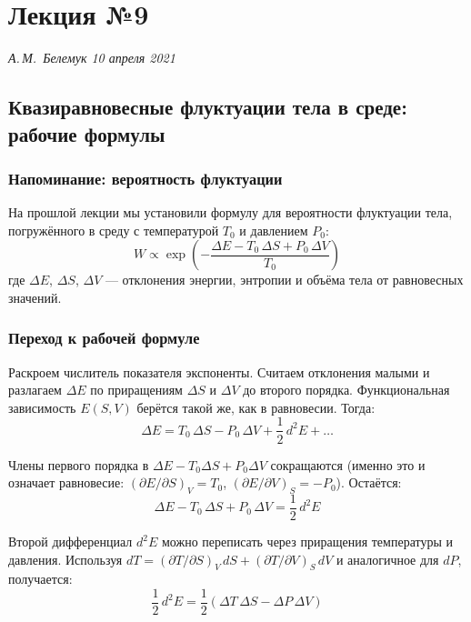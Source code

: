 \documentclass[../general/general]{subfiles}
\begin{document}
\chapter{Лекция №9}
\noindent\textit{А.\,М.~Белемук \hfill 10 апреля 2021}
\vspace{1em}
\ifSubfilesClassLoaded{\tableofcontents\newpage}{}


\section{Квазиравновесные флуктуации тела в среде: рабочие формулы}

\subsection{Напоминание: вероятность флуктуации}

На прошлой лекции мы установили формулу для вероятности флуктуации тела, погружённого в среду с температурой $T_0$ и давлением $P_0$:
\begin{equation}
    W \propto \exp\!\left(-\frac{\Delta E - T_0\,\Delta S + P_0\,\Delta V}{T_0}\right)
    \label{eq:W_medium_9}
\end{equation}
где $\Delta E$, $\Delta S$, $\Delta V$ --- отклонения энергии, энтропии и объёма тела от равновесных значений.

\subsection{Переход к рабочей формуле}

Раскроем числитель показателя экспоненты. Считаем отклонения малыми и разлагаем $\Delta E$ по приращениям $\Delta S$ и $\Delta V$ до второго порядка. Функциональная зависимость $E(S,V)$ берётся такой же, как в равновесии. Тогда:
\begin{equation}
    \Delta E = T_0\,\Delta S - P_0\,\Delta V + \frac{1}{2}\,d^2E + \ldots
\end{equation}

Члены первого порядка в $\Delta E - T_0\Delta S + P_0\Delta V$ сокращаются (именно это и означает равновесие: $(\partial E/\partial S)_V = T_0$, $(\partial E/\partial V)_S = -P_0$). Остаётся:
\begin{equation}
    \Delta E - T_0\,\Delta S + P_0\,\Delta V = \frac{1}{2}\,d^2E
\end{equation}

Второй дифференциал $d^2E$ можно переписать через приращения температуры и давления. Используя $dT = (\partial T/\partial S)_V\,dS + (\partial T/\partial V)_S\,dV$ и аналогичное для $dP$, получается:
\begin{equation}
    \frac{1}{2}\,d^2E = \frac{1}{2}\!\left(\Delta T\,\Delta S - \Delta P\,\Delta V\right)
\end{equation}
\end{document}
